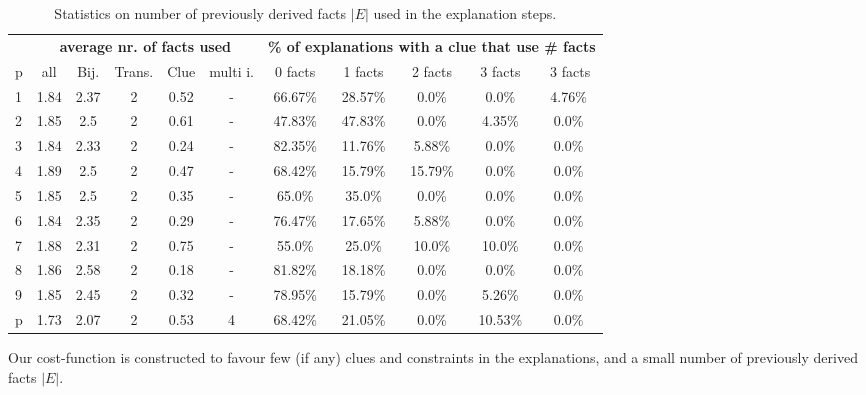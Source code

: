 \begin{table}[t]
	\centering
	\begin{tabular}{l|c|cccc|ccccc}
		  & \multicolumn{5}{c|}{\bf average nr. of facts used} & \multicolumn{5}{c}{\bf \% of explanations with a clue that use \# facts}                                                                                \\
		p & all &  Bij. & Trans. &  Clue & multi i. & 0 facts & 1 facts & 2 facts & 3 facts & $\>$3 facts \\\hline
		      1 &      1.84 &  2.37 &      2 &  0.52 &        - &  66.67\% &  28.57\% &    0.0\% &    0.0\% &    4.76\% \\
		      2 &      1.85 &   2.5 &      2 &  0.61 &        - &  47.83\% &  47.83\% &    0.0\% &   4.35\% &     0.0\% \\
		      3 &      1.84 &  2.33 &      2 &  0.24 &        - &  82.35\% &  11.76\% &   5.88\% &    0.0\% &     0.0\% \\
		      4 &      1.89 &   2.5 &      2 &  0.47 &        - &  68.42\% &  15.79\% &  15.79\% &    0.0\% &     0.0\% \\
		      5 &      1.85 &   2.5 &      2 &  0.35 &        - &   65.0\% &   35.0\% &    0.0\% &    0.0\% &     0.0\% \\
		      6 &      1.84 &  2.35 &      2 &  0.29 &        - &  76.47\% &  17.65\% &   5.88\% &    0.0\% &     0.0\% \\
		      7 &      1.88 &  2.31 &      2 &  0.75 &        - &   55.0\% &   25.0\% &   10.0\% &   10.0\% &     0.0\% \\
		      8 &      1.86 &  2.58 &      2 &  0.18 &        - &  81.82\% &  18.18\% &    0.0\% &    0.0\% &     0.0\% \\
		      9 &      1.85 &  2.45 &      2 &  0.32 &        - &  78.95\% &  15.79\% &    0.0\% &   5.26\% &     0.0\% \\ 
			  p &      1.73 &  2.07 &      2 &  0.53 &        4 &  68.42\% &  21.05\% &    0.0\% &  10.53\% &     0.0\% \\
	\end{tabular}
	\caption{Statistics on number of previously derived facts $|E|$ used in the explanation steps.}
 	\label{table:sequence_leve}
\end{table}
Our cost-function is constructed to favour few (if any) clues and constraints in the explanations, and a small number of previously derived facts $|E|$.
